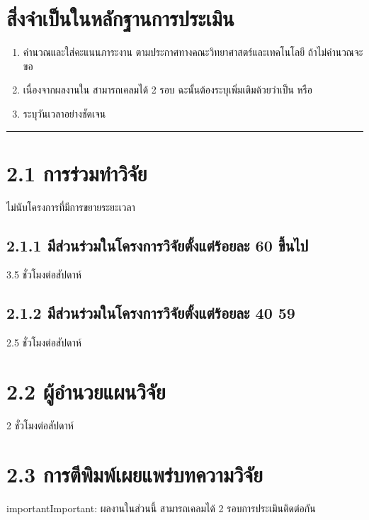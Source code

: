 \documentclass[a4paper,12pt,english]{sphinxmanual}
\begin{document}
\section{สิ่งจำเป็นในหลักฐานการประเมิน}
\label{\detokenize{2research:id3}}\begin{enumerate}
%
\item {} 
 คำนวณและใส่คะแนนภาระงาน ตามประกาศทางคณะวิทยาศาสตร์และเทคโนโลยี ถ้าไม่คำนวณจะขอ

\item {} 
เนื่องจากผลงานใน {\hyperref[\detokenize{2research:id8}]{}} สามารถเคลมได้ 2 รอบ ฉะนั้นต้องระบุเพิ่มเติมด้วยว่าเป็น  หรือ 

\item {} 
ระบุวันเวลาอย่างชัดเจน

\end{enumerate}


\bigskip\hrule\bigskip



\section{2.1 การร่วมทำวิจัย}
\label{\detokenize{2research:id4}}
ไม่นับโครงการที่มีการขยายระยะเวลา


\subsection{2.1.1 มีส่วนร่วมในโครงการวิจัยตั้งแต่ร้อยละ 60 ขึ้นไป}
\label{\detokenize{2research:id5}}
3.5 ชั่วโมงต่อสัปดาห์


\subsection{2.1.2 มีส่วนร่วมในโครงการวิจัยตั้งแต่ร้อยละ 40 \sphinxhyphen{} 59}
\label{\detokenize{2research:id6}}
2.5 ชั่วโมงต่อสัปดาห์


\section{2.2 ผู้อำนวยแผนวิจัย}
\label{\detokenize{2research:id7}}
2 ชั่วโมงต่อสัปดาห์


\section{2.3 การตีพิมพ์เผยแพร่บทความวิจัย}
\label{\detokenize{2research:id8}}\label{\detokenize{2research:id9}}
\begin{sphinxadmonition}{important}{Important:}
ผลงานในส่วนนี้ สามารถเคลมได้ 2 รอบการประเมินติดต่อกัน
\end{sphinxadmonition}
\end{document}
